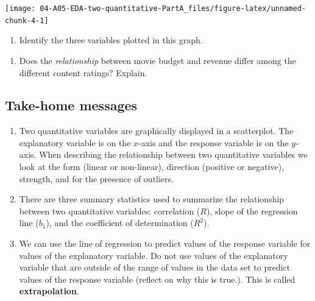 \documentclass[
]{report}
\providecommand{\tightlist}{%
  \setlength{\itemsep}{0pt}\setlength{\parskip}{0pt}}
\begin{document}
\begin{center}\texttt{[image: 04-A05-EDA-two-quantitative-PartA\_files/figure-latex/unnamed-chunk-4-1]} \end{center}

\begin{enumerate}
\def\labelenumi{\arabic{enumi}.}
\setcounter{enumi}{10}
\tightlist
\item
  Identify the three variables plotted in this graph.
\end{enumerate}

\vspace{0.5in}

\begin{enumerate}
\def\labelenumi{\arabic{enumi}.}
\setcounter{enumi}{11}
\tightlist
\item
  Does the \emph{relationship} between movie budget and revenue differ among the different content ratings? Explain.
\end{enumerate}

\vspace{0.8in}
\newpage

\hypertarget{take-home-messages-6}{%
\subsection{Take-home messages}\label{take-home-messages-6}}

\begin{enumerate}
\def\labelenumi{\arabic{enumi}.}
\item
  Two quantitative variables are graphically displayed in a scatterplot. The explanatory variable is on the \(x\)-axis and the response variable is on the \(y\)-axis. When describing the relationship between two quantitative variables we look at the form (linear or non-linear), direction (positive or negative), strength, and for the presence of outliers.
\item
  There are three summary statistics used to summarize the relationship between two quantitative variables: correlation (\(R\)), slope of the regression line (\(b_1\)), and the coefficient of determination (\(R^2\)).
\item
  We can use the line of regression to predict values of the response variable for values of the explanatory variable. Do not use values of the explanatory variable that are outside of the range of values in the data set to predict values of the response variable (reflect on why this is true.). This is called \textbf{extrapolation}.
\end{enumerate}
\end{document}
